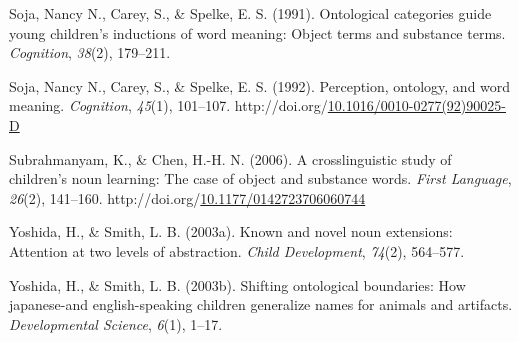 \documentclass[10pt, letterpaper]{article}
\newenvironment{CSLReferences}%
  {}%
  {\par}
\begin{document}
\begin{CSLReferences}{1}{0}
\leavevmode{}%
Soja, Nancy N., Carey, S., \& Spelke, E. S. (1991). Ontological
categories guide young children's inductions of word meaning: Object
terms and substance terms. \emph{Cognition}, \emph{38}(2), 179--211.

\leavevmode{}%
Soja, Nancy N., Carey, S., \& Spelke, E. S. (1992). Perception,
ontology, and word meaning. \emph{Cognition}, \emph{45}(1), 101--107.
http://doi.org/\href{https://doi.org/10.1016/0010-0277(92)90025-D}{10.1016/0010-0277(92)90025-D}

\leavevmode{}%
Subrahmanyam, K., \& Chen, H.-H. N. (2006). A crosslinguistic study of
children's noun learning: {The} case of object and substance words.
\emph{First Language}, \emph{26}(2), 141--160.
http://doi.org/\href{https://doi.org/10.1177/0142723706060744}{10.1177/0142723706060744}

\leavevmode{}%
Yoshida, H., \& Smith, L. B. (2003a). Known and novel noun extensions:
Attention at two levels of abstraction. \emph{Child Development},
\emph{74}(2), 564--577.

\leavevmode{}%
Yoshida, H., \& Smith, L. B. (2003b). Shifting ontological boundaries:
How japanese-and english-speaking children generalize names for animals
and artifacts. \emph{Developmental Science}, \emph{6}(1), 1--17.

\end{CSLReferences}


\end{document}
